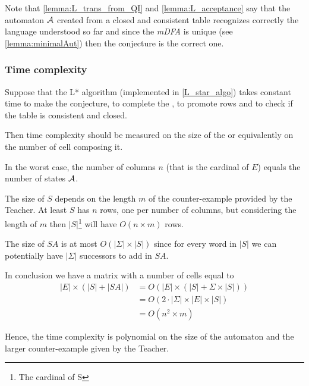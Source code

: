 \begin{remark}
  Note that \cref{lemma:L_trans_from_QI} and \cref{lemma:L_acceptance} say that the automaton $\mathcal{A}$ created from a closed and consistent table recognizes correctly the language understood so far and since the \textit{mDFA} is unique (see \cref{lemma:minimalAut}) then the conjecture is the correct one.
\end{remark}

\subsubsection{Time complexity}
Suppose that the L* algorithm (implemented in \cref{L_star_algo}) takes constant time to make the conjecture, to complete the \OT, to promote rows and to check if the table is consistent and closed.

Then time complexity should be measured on the size of the \OT or equivalently on the number of cell composing it.

In the worst case, the number of columns $n$ (that is the cardinal of $E$) equals the number of states $\mathcal{A}$.

The size of $S$ depends on the length $m$ of the counter-example provided by the Teacher. At least $S$ has $n$ rows, one per number of columns, but considering the length of $m$ then $|S|$\footnote{The cardinal of S} will have $O(n \times m)$ rows.

The size of $SA$ is at most $O(|\Sigma| \times |S|)$ since for every word in $|S|$ we can potentially have $|\Sigma|$ successors to add in $SA$.

In conclusion we have a matrix with a number of cells equal to
\begin{align*}
  |E|\times(|S| + |SA|) & = O(|E|\times(|S| + \Sigma \times |S|))     \\
                        & = O(2 \cdot |\Sigma| \times |E| \times |S|) \\
                        & = O(n^2 \times m)
\end{align*}

Hence, the time complexity is polynomial on the size of the automaton and the larger counter-example given by the Teacher.
